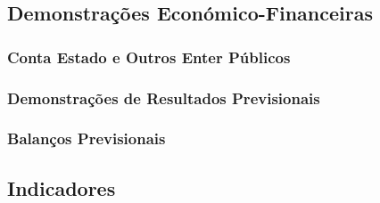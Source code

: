 \documentclass[11pt]{article}
\begin{document}
	\normalsize
	
	
	\large
	\subsection{Demonstrações Económico-Financeiras}
	
	\normalsize
	
	
	\large
	\subsubsection{Conta Estado e Outros Enter Públicos}
	
	\normalsize
	
	
	\large
	\subsubsection{Demonstrações de Resultados Previsionais}
	
	\normalsize
	
	
	\large
	\subsubsection{Balanços Previsionais}
	
	\normalsize
	
	
	\large
	\subsection{Indicadores}
	
	\normalsize

	\pagebreak

	\listoffigures
\end{document}
